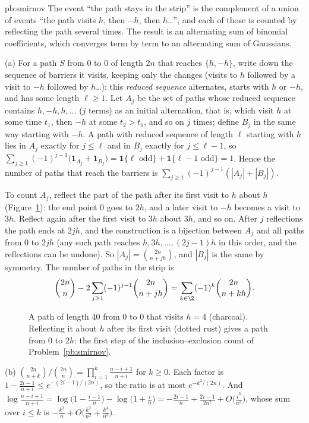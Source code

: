 \begin{solution}{pb:smirnov}
\idea The event ``the path stays in the strip'' is the complement of a union of events ``the path visits $h$, then $-h$, then $h$\dots'', and each of those is counted by
reflecting the path several times. The result is an alternating sum of binomial coefficients, which converges term by term to an alternating sum of Gaussians.

\writeup (a) For a path $S$ from $0$ to $0$ of length $2n$ that reaches $\{h,-h\}$, write down the sequence of barriers it visits, keeping only the changes (visits to $h$
followed by a visit to $-h$ followed by $h$\dots): this \emph{reduced sequence} alternates, starts with $h$ or $-h$, and has some length $\ell\ge1$. Let $A_j$ be the set of
paths whose reduced sequence contains $h,-h,h,\dots$ ($j$ terms) as an initial alternation, that is, which visit $h$ at some time $t_1$, then $-h$ at some $t_2>t_1$, and
so on $j$ times; define $B_j$ in the same way starting with $-h$. A path with reduced sequence of length $\ell$ starting with $h$ lies in $A_j$ exactly for $j\le\ell$
and in $B_j$ exactly for $j\le\ell-1$, so $\sum_{j\ge1}(-1)^{j-1}\bigl(\mathbf 1_{A_j}+\mathbf 1_{B_j}\bigr)=\mathbf 1\{\ell\text{ odd}\}+\mathbf 1\{\ell-1\text{ odd}\}=1$. Hence the number of
paths that reach the barriers is $\sum_{j\ge1}(-1)^{j-1}(|A_j|+|B_j|)$.

To count $A_j$, reflect the part of the path after its first visit to $h$ about $h$ (Figure~\ref{fig:strip}): the end point $0$ goes to $2h$, and a later visit to $-h$
becomes a visit to $3h$. Reflect again after the first visit to $3h$ about $3h$, and so on. After $j$ reflections the path ends at $2jh$, and the construction is a bijection
between $A_j$ and all paths from $0$ to $2jh$ (any such path reaches $h,3h,\dots,(2j-1)h$ in this order, and the reflections can be undone). So
$|A_j|=\binom{2n}{n+jh}$, and $|B_j|$ is the same by symmetry. The number of paths in the strip is
\[
\binom{2n}n-2\sum_{j\ge1}(-1)^{j-1}\binom{2n}{n+jh}=\sum_{k\in\Z}(-1)^k\binom{2n}{n+kh}.
\]

\begin{figure}[ht]
\centering{}
\caption{A path of length $40$ from $0$ to $0$ that visits $h=4$ (charcoal). Reflecting it about $h$ after its first visit (dotted rust) gives a path from $0$ to $2h$:
the first step of the inclusion--exclusion count of Problem~\ref{pb:smirnov}.}
\label{fig:strip}
\end{figure}

(b) $\binom{2n}{n+k}\big/\binom{2n}n=\prod_{i=1}^k\frac{n-i+1}{n+i}$ for $k\ge0$. Each factor is $1-\frac{2i-1}{n+i}\le e^{-(2i-1)/(2n)}$, so the ratio is at most $e^{-k^2/(2n)}$. And
$\log\frac{n-i+1}{n+i}=\log\bigl(1-\frac{i-1}n\bigr)-\log\bigl(1+\frac in\bigr)=-\frac{2i-1}n+\frac{2i-1}{2n^2}+O\bigl(\frac{i^3}{n^3}\bigr)$, whose sum over $i\le k$ is
$-\frac{k^2}n+O\bigl(\frac{k^2}{n^2}+\frac{k^4}{n^3}\bigr)$.


\end{solution}
